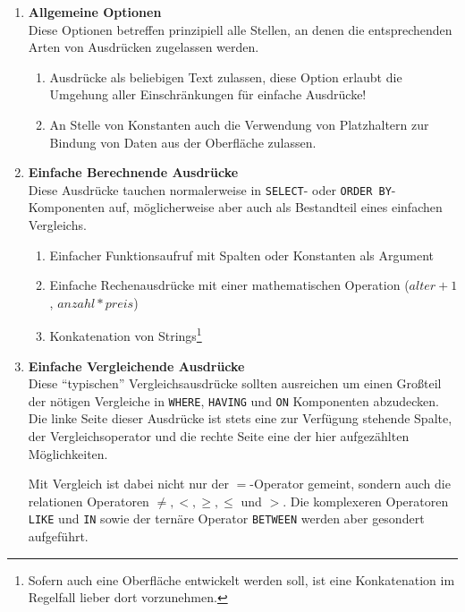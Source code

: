 \begin{enumerate}[resume]
\item \textbf{Allgemeine Optionen} \\
  Diese Optionen betreffen prinzipiell alle Stellen, an denen die entsprechenden Arten von Ausdrücken zugelassen werden.
  \begin{enumerate}[noitemsep]
  \item \label{feat:expr-allow-any-text} Ausdrücke als beliebigen Text zulassen, diese Option erlaubt die Umgehung aller Einschränkungen für einfache Ausdrücke!
  \item \label{feat:expr-allow-placeholder} An Stelle von Konstanten auch die Verwendung von Platzhaltern zur Bindung von Daten aus der Oberfläche zulassen.
  \end{enumerate}

\item \label{feat:expr-compute}  \textbf{Einfache Berechnende Ausdrücke} \\
  Diese Ausdrücke tauchen normalerweise in \texttt{SELECT}- oder \texttt{ORDER BY}-Komponenten auf, möglicherweise aber auch als Bestandteil eines einfachen Vergleichs.
  \begin{enumerate}[noitemsep]
      \item \label{feat:expr-compute-simple-func} Einfacher Funktionsaufruf mit Spalten oder Konstanten als Argument
      \item \label{feat:expr-compute-simple-arithmetic} Einfache Rechenausdrücke mit einer mathematischen Operation ($alter + 1$, $anzahl * preis$)
      \item \label{feat:expr-compute-simple-concat} Konkatenation von Strings\footnote{Sofern auch eine Oberfläche entwickelt werden soll, ist eine Konkatenation im Regelfall lieber dort vorzunehmen.}
  \end{enumerate}

\item \textbf{Einfache Vergleichende Ausdrücke} \\
  Diese ``typischen'' Vergleichsausdrücke sollten ausreichen um einen Großteil der nötigen Vergleiche in \texttt{WHERE}, \texttt{HAVING} und \texttt{ON} Komponenten abzudecken. Die linke Seite dieser Ausdrücke ist stets eine zur Verfügung stehende Spalte, der Vergleichsoperator und die rechte Seite eine der hier aufgezählten Möglichkeiten.

  Mit Vergleich ist dabei nicht nur der $=$-Operator gemeint, sondern auch die relationen Operatoren $\ne, <,\ge,\le$ und $>$. Die komplexeren Operatoren \texttt{LIKE} und \texttt{IN} sowie der ternäre Operator \texttt{BETWEEN} werden aber gesondert aufgeführt.


\end{enumerate}
